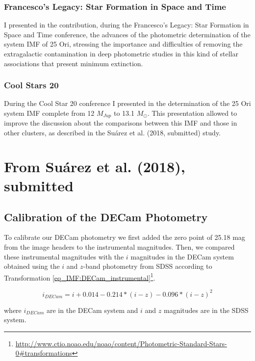\documentclass[12pt]{article}
\begin{document}
\subsubsection{Francesco's Legacy: Star Formation in Space and Time}
\label{sec:SFST2017}
I presented in the \citet{Suarez2017c} contribution, during the Francesco's Legacy: Star Formation in Space and Time conference, the advances of the photometric determination of the system IMF of 25 Ori, stressing the importance and difficulties of removing the extragalactic contamination in deep photometric studies in this kind of stellar associations that present minimum extinction.

\subsubsection{Cool Stars 20}
\label{sec:CS20}
During the Cool Star 20 conference I presented in \citet{Suarez2018} the determination of the 25 Ori system IMF complete from 12 $M_{Jup}$ to 13.1 $M_\odot$. This presentation allowed to improve the discussion about the comparisons between this IMF and those in other clusters, as described in the Su\'arez et al. (2018, submitted) study.

\section{From Su\'arez et al. (2018), submitted}
\subsection[DECam Photometry Calibration]{Calibration of the DECam Photometry}
\label{sec_app_IMF:DECam_calibration}
To calibrate our DECam photometry we first added the zero point of 25.18 mag from the image headers to the instrumental magnitudes. Then, we compared these instrumental magnitudes with the $i$ magnitudes in the DECam system obtained using the $i$ and $z$-band photometry from SDSS according to Transformation \ref{eq_IMF:DECam_instrumental}\footnote{\url{http://www.ctio.noao.edu/noao/content/Photometric-Standard-Stars-0\#transformations}}.

\begin{equation} \label{eq_IMF:DECam_instrumental}
	i_{DECam}    = i + 0.014 - 0.214*(i-z) - 0.096*(i-z)^2
\end{equation}

where $i_{DECam}$ are in the DECam system and $i$ and $z$ magnitudes are in the SDSS system.
\end{document}
